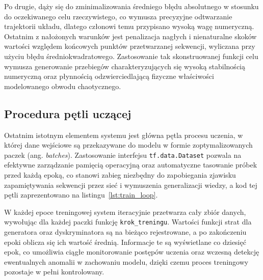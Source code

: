 Po drugie, dąży się do zminimalizowania średniego błędu absolutnego w stosunku do oczekiwanego celu rzeczywistego, co wymusza precyzyjne odtwarzanie trajektorii układu, dlatego członowi temu przypisano wysoką wagę numeryczną. Ostatnim z nałożonych warunków jest penalizacja nagłych i nienaturalne skoków wartości względem końcowych punktów przetwarzanej sekwencji, wyliczana przy użyciu błędu średniokwadratowego. Zastosowanie tak skonstruowanej funkcji celu wymusza generowanie przebiegów charakteryzujących się wysoką stabilnością numeryczną oraz płynnością odzwierciedlającą fizyczne właściwości modelowanego obwodu chaotycznego.
 

 
\subsection{Procedura pętli uczącej}
 
Ostatnim istotnym elementem systemu jest główna pętla procesu uczenia, w której dane wejściowe są przekazywane do modelu w formie zoptymalizowanych paczek (ang. \textit{batches}). Zastosowanie interfejsu \texttt{tf.data.Dataset} pozwala na efektywne zarządzanie pamięcią operacyjną oraz automatyczne tasowanie próbek przed każdą epoką, co stanowi zabieg niezbędny do zapobiegania zjawisku zapamiętywania sekwencji przez sieć i wymuszenia generalizacji wiedzy, a kod tej pętli zaprezentowano na listingu~\ref{lst:train_loop}.
 
W każdej epoce treningowej system iteracyjnie przetwarza cały zbiór danych, wywołując dla każdej paczki funkcję \texttt{krok\_treningu}. Wartości funkcji strat dla generatora oraz dyskryminatora są na bieżąco rejestrowane, a po zakończeniu epoki oblicza się ich wartość średnią. Informacje te są wyświetlane co dziesięć epok, co umożliwia ciągłe monitorowanie postępów uczenia oraz wczesną detekcję ewentualnych anomalii w zachowaniu modelu, dzięki czemu proces treningowy pozostaje w pełni kontrolowany.
 

